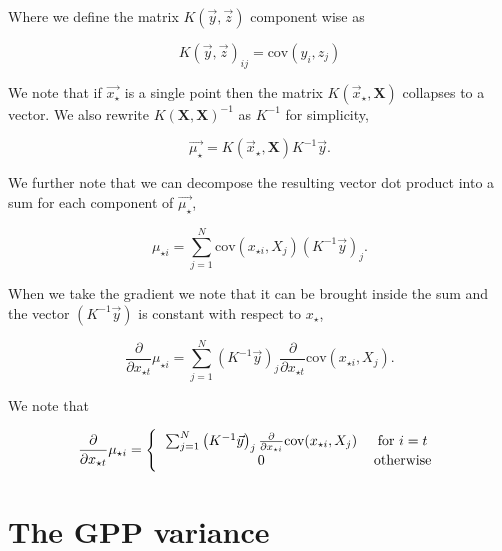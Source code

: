 \documentclass[phd,tocprelim]{cornell}
\begin{document}
Where we define the matrix $K(\vec{y}, \vec{z})$ component wise as

\begin{equation}
 K(\vec{y}, \vec{z})_{ij} = \mbox{cov}(y_{i}, z_{j})
\end{equation}


We note that if $\vec{x_{\star}}$ is a single point then the matrix $K(\vec{x}_{\star}, \textbf{X} )$ collapses to a vector. We also rewrite $K(\textbf{X},\textbf{X})^{-1}$ as $K^{-1}$ for simplicity,

\begin{equation}
 \vec{\mu_{\star}} = K(\vec{x}_{\star}, \textbf{X} ) K^{-1} \vec{y}.
\end{equation}

We further note that we can decompose the resulting vector dot product into a sum for each component of $\vec{\mu_{\star}}$,

\begin{equation}
 \mu_{\star {i}} = \sum_{j = 1}^{N} \mbox{cov}(x_{\star i}, X_{j}) \left(K^{-1} \vec{y} \right)_{j}.
\end{equation}

When we take the gradient we note that it can be brought inside the sum and the vector $(K^{-1}\vec{y})$ is constant with respect to $x_{\star}$,

\begin{equation}
 \frac{\partial}{\partial x_{\star t}} \mu_{\star i} = \sum_{j = 1}^{N} \left(K^{-1} \vec{y} \right)_{j} \frac{\partial}{\partial x_{\star t}} \mbox{cov}(x_{\star i}, X_{j}).
\end{equation}

We note that

\[ \frac{\partial}{\partial x_{\star t}} \mu_{\star i} = \left\{ \begin{tabular}{cc}
                                                                  $\sum_{j = 1}^{N} \left(K^{-1} \vec{y} \right)_{j} \frac{\partial}{\partial x_{\star i}} \mbox{cov}(x_{\star i}, X_{j})$ & for $i = t$ \\
								  0 & otherwise
                                                                 \end{tabular}\right.
\]


\section{The GPP variance}
\end{document}

